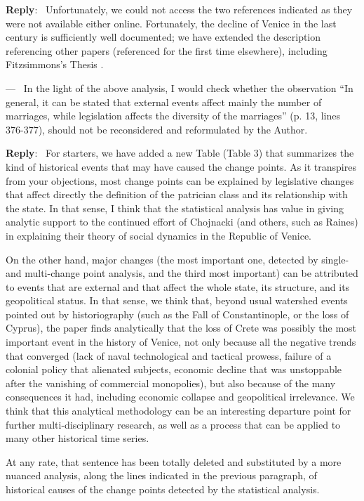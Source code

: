 \documentclass[11pt]{article}
\newcounter{reviewer}
\newcounter{point}[reviewer]
\renewcommand{\thepoint}{P\,\thereviewer.\arabic{point}}
\newenvironment{point}
   {\refstepcounter{point} \bigskip \noindent {\textbf{Reviewer~Point~\thepoint} } ---\ }
   {\par }
\newenvironment{reply}
   {\medskip \noindent \begin{sf}\textbf{Reply}:\  }
   {\medskip \end{sf}}
\begin{document}
\begin{reply}
  Unfortunately, we could not access the two references indicated as they were
  not available either online. Fortunately, the decline of Venice in the last
  century is sufficiently well documented; we have extended the description
  referencing other papers (referenced for the first time elsewhere), including
  Fitzsimmons's Thesis \cite{decline}.
\end{reply}

\begin{point}
  In the light of the above analysis, I would check whether the observation “In
  general, it can be stated that external events affect mainly the number of
  marriages, while legislation affects the diversity of the marriages” (p. 13,
  lines 376-377), should not be reconsidered and reformulated by the Author.
\end{point}

\begin{reply}
  For starters, we have added a new Table (Table 3) that summarizes the kind of
  historical events that may have caused the change points. As it transpires
  from your objections, most change points can be explained by legislative
  changes that affect directly the definition of the patrician class and its
  relationship with the state. In that sense, I think that the statistical
  analysis has value in giving analytic support to the continued effort of
  Chojnacki (and others, such as Raines) in explaining their theory of social
  dynamics in the Republic of Venice.

  On the other hand, major changes (the most important one, detected by single-
  and multi-change point analysis, and the third most important) can be
  attributed to events that are external and that affect the whole state, its
  structure, and its geopolitical status. In that sense, we think that, beyond
  usual watershed events pointed out by historiography (such as the Fall of
  Constantinople, or the loss of Cyprus), the paper finds analytically that the
  loss of Crete was possibly the most important event in the history of Venice,
  not only because all the negative trends that converged (lack of naval technological
  and tactical prowess, failure of a colonial policy that alienated subjects,
  economic decline that was unstoppable after the vanishing of commercial
  monopolies), but also because of the many consequences it had, including
  economic collapse and geopolitical irrelevance. We think that this analytical
  methodology can be an interesting departure point for further
  multi-disciplinary research, as well as a process that can be applied to many
  other historical time series.

  At any rate, that sentence has been totally deleted and substituted by a more
  nuanced analysis, along the lines indicated in the previous paragraph, of
  historical causes of the change points detected by the statistical analysis.
\end{reply}
\end{document}
